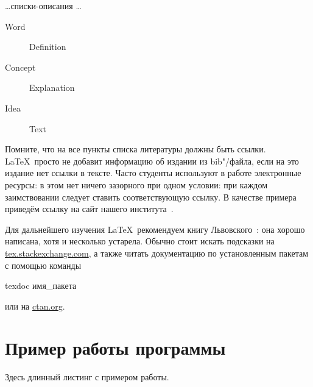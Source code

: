 \dots списки-описания \dots

\begin{description}
  \item[Word] Definition
  \item[Concept] Explanation
  \item[Idea] Text
\end{description}

\Conc

Помните, что на все пункты списка литературы должны быть ссылки. \LaTeX\ просто не добавит информацию об издании из bib"/файла, если на это издание нет ссылки в тексте. Часто студенты используют в работе  электронные ресурсы: в этом нет ничего зазорного при одном условии: при каждом заимствовании следует ставить соответствующую ссылку. В качестве примера приведём ссылку на сайт нашего института~\autocite{mmcs}.

Для дальнейшего изучения \LaTeX\ рекомендуем книгу Львовского~\autocite{Lvo2003}: она хорошо написана, хотя и несколько устарела.
Обычно стоит искать подсказки на
\href{http://tex.stackexchange.com/}{tex.stackexchange.com}, а также
читать документацию по установленным пакетам с помощью
команды
\begin{Verb}
texdoc имя_пакета
\end{Verb}
или на \href{http://ctan.org/}{ctan.org}.

\printbibliography[%
    heading=bibintoc%
]

\appendix
{}


\section{Пример работы программы}

Здесь длинный листинг с примером работы.


